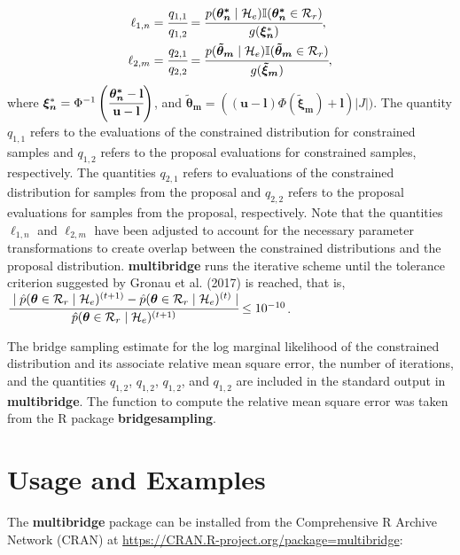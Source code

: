\documentclass[
  english,
  man,floatsintext]{apa6}
\begin{document}
\begin{align}
    \ell_{1,n} &= \cfrac{q_{1,1}}{q_{1,2}}  = \cfrac{p(\boldsymbol{\theta^*_n}\mid \mathcal{H}_e) \mathbb{I}(\boldsymbol{\theta^*_n}\in\mathcal{R}_r)}{g(\boldsymbol{\xi_n}^*)},\\
    \ell_{2,m} &= \cfrac{q_{2,1}}{q_{2,2}} = \cfrac{p(\boldsymbol{\tilde \theta_m}\mid \mathcal{H}_e) \mathbb{I}(\boldsymbol{\tilde \theta_m}\in\mathcal{R}_r)}{g(\boldsymbol{\tilde \xi_m})},
\end{align}
where \(\boldsymbol{\xi_n}^* = \Phi^{-1}\left(\cfrac{\boldsymbol{\theta^*_n} - \mathbf{l}}{\mathbf{u} - \mathbf{l}}\right)\), and \(\boldsymbol{\tilde \theta_m} = ((\mathbf{u} - \mathbf{l})\Phi(\boldsymbol{\tilde \xi_m}) + \mathbf{l}) \left|J\right|)\). The quantity \(q_{1,1}\) refers to the evaluations of the constrained distribution for constrained samples and \(q_{1,2}\) refers to the proposal evaluations for constrained samples, respectively. The quantities \(q_{2,1}\) refers to evaluations of the constrained distribution for samples from the proposal and \(q_{2,2}\) refers to the proposal evaluations for samples from the proposal, respectively. Note that the quantities \(\ell_{1,n}\) and \(\ell_{2,m}\) have been adjusted to account for the necessary parameter transformations to create overlap between the constrained distributions and the proposal distribution. \textbf{multibridge} runs the iterative scheme until the tolerance criterion suggested by Gronau et al. (2017) is reached, that is, \(\cfrac{\mid \hat p(\boldsymbol{\theta} \in \mathcal{R}_r \mid \mathcal{H}_e)^{(t + 1)} - \hat p(\boldsymbol{\theta} \in \mathcal{R}_r \mid \mathcal{H}_e)^{(t)} \mid}{\hat p(\boldsymbol{\theta} \in \mathcal{R}_r \mid \mathcal{H}_e)^{(t + 1)}} \leq 10^{-10}\).

The bridge sampling estimate for the log marginal likelihood of the constrained distribution and its associate relative mean square error, the number of iterations, and the quantities \(q_{1,2}\), \(q_{1,2}\), \(q_{1,2}\), and \(q_{1,2}\) are included in the standard output in \textbf{multibridge}. The function to compute the relative mean square error was taken from the R package \textbf{bridgesampling}.

\hypertarget{usage-and-examples}{%
\section{Usage and Examples}\label{usage-and-examples}}

The \textbf{multibridge} package can be installed from the Comprehensive R Archive Network (CRAN) at
\url{https://CRAN.R-project.org/package=multibridge}:
\end{document}
